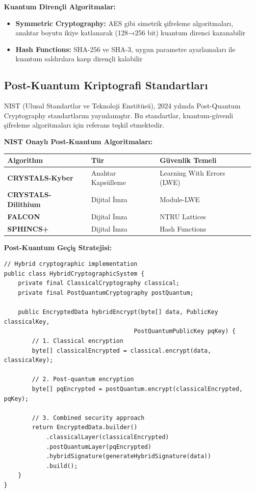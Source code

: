 \textbf{Kuantum Dirençli Algoritmalar:}
\begin{itemize}
    \item \textbf{Symmetric Cryptography:} AES gibi simetrik şifreleme algoritmaları, anahtar boyutu ikiye katlanarak (128→256 bit) kuantum direnci kazanabilir
    \item \textbf{Hash Functions:} SHA-256 ve SHA-3, uygun parametre ayarlamaları ile kuantum saldırılara karşı dirençli kalabilir
\end{itemize}

\subsection{Post-Kuantum Kriptografi Standartları}

NIST (Ulusal Standartlar ve Teknoloji Enstitüsü), 2024 yılında Post-Quantum Cryptography standartlarını yayınlamıştır. Bu standartlar, kuantum-güvenli şifreleme algoritmaları için referans teşkil etmektedir.

\textbf{NIST Onaylı Post-Kuantum Algoritmaları:}

\begin{tabular}{|p{4cm}|p{6cm}|p{4cm}|}
\hline
\hline
\textbf{Algorithm} & \textbf{Tür} & \textbf{Güvenlik Temeli}  \\
\hline
\hline
\textbf{CRYSTALS-Kyber} & Anahtar Kapsülleme & Learning With Errors (LWE)  \\
\hline
\hline
\textbf{CRYSTALS-Dilithium} & Dijital İmza & Module-LWE  \\
\hline
\hline
\textbf{FALCON} & Dijital İmza & NTRU Lattices  \\
\hline
\hline
\textbf{SPHINCS+} & Dijital İmza & Hash Functions  \\
\hline
\hline
\hline
\end{tabular}

\textbf{Post-Kuantum Geçiş Stratejisi:}
\begin{lstlisting}[breaklines=true,basicstyle=\ttfamily\footnotesize]
// Hybrid cryptographic implementation
public class HybridCryptographicSystem {
    private final ClassicalCryptography classical;
    private final PostQuantumCryptography postQuantum;
    
    public EncryptedData hybridEncrypt(byte[] data, PublicKey classicalKey, 
                                     PostQuantumPublicKey pqKey) {
        // 1. Classical encryption
        byte[] classicalEncrypted = classical.encrypt(data, classicalKey);
        
        // 2. Post-quantum encryption  
        byte[] pqEncrypted = postQuantum.encrypt(classicalEncrypted, pqKey);
        
        // 3. Combined security approach
        return EncryptedData.builder()
            .classicalLayer(classicalEncrypted)
            .postQuantumLayer(pqEncrypted)
            .hybridSignature(generateHybridSignature(data))
            .build();
    }
}
\end{lstlisting}

